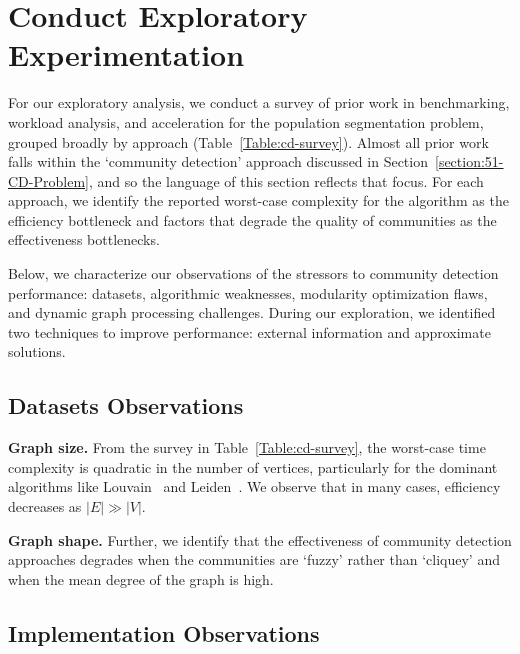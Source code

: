 \section{Conduct Exploratory Experimentation}
\label{section:53-CD-Exploration}

For our exploratory analysis, we conduct a survey of prior work in \gai benchmarking, workload analysis, and acceleration for the population segmentation problem, grouped broadly by approach (Table~\ref{Table:cd-survey}).
Almost all prior work falls within the `community detection' approach discussed in Section~\ref{section:51-CD-Problem}, and so the language of this section reflects that focus.
For each approach, we identify the reported worst-case complexity for the algorithm as the efficiency bottleneck and factors that degrade the quality of communities as the effectiveness bottlenecks. 

Below, we characterize our observations of the stressors to community detection performance: datasets, algorithmic weaknesses, modularity optimization flaws, and dynamic graph processing challenges.
During our exploration, we identified two techniques to improve performance: external information and approximate solutions. 



\subsection{Datasets Observations}

\textbf{Graph size.}
From the survey in  Table~\ref{Table:cd-survey}, the worst-case time complexity is quadratic in the number of vertices, particularly for the dominant algorithms like Louvain~\cite{Blondel2008} and Leiden~\cite{Traag2019}.
We observe that in many cases, efficiency decreases as $|E|\gg|V|$. 

\textbf{Graph shape.}
Further, we identify that the effectiveness of community detection approaches degrades when the communities are `fuzzy' rather than `cliquey' and when the mean degree of the graph is high.

\subsection{Implementation Observations}


